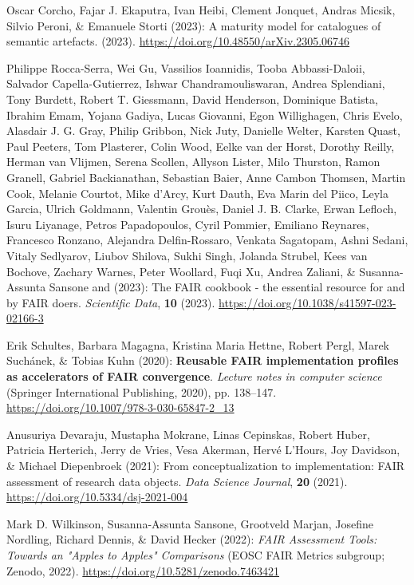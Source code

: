 \begin{thebibliography}{9}
Oscar Corcho, Fajar J. Ekaputra, Ivan Heibi, Clement Jonquet, Andras
Micsik, Silvio Peroni, \& Emanuele Storti (2023): A maturity model for
catalogues of semantic artefacts. (2023).
\url{https://doi.org/10.48550/arXiv.2305.06746}

Philippe Rocca-Serra, Wei Gu, Vassilios Ioannidis, Tooba Abbassi-Daloii,
Salvador Capella-Gutierrez, Ishwar Chandramouliswaran, Andrea
Splendiani, Tony Burdett, Robert T. Giessmann, David Henderson,
Dominique Batista, Ibrahim Emam, Yojana Gadiya, Lucas Giovanni, Egon
Willighagen, Chris Evelo, Alasdair J. G. Gray, Philip Gribbon, Nick
Juty, Danielle Welter, Karsten Quast, Paul Peeters, Tom Plasterer, Colin
Wood, Eelke van der Horst, Dorothy Reilly, Herman van Vlijmen, Serena
Scollen, Allyson Lister, Milo Thurston, Ramon Granell, Gabriel
Backianathan, Sebastian Baier, Anne Cambon Thomsen, Martin Cook, Melanie
Courtot, Mike d'Arcy, Kurt Dauth, Eva Marin del Piico, Leyla Garcia,
Ulrich Goldmann, Valentin Grouès, Daniel J. B. Clarke, Erwan Lefloch,
Isuru Liyanage, Petros Papadopoulos, Cyril Pommier, Emiliano Reynares,
Francesco Ronzano, Alejandra Delfin-Rossaro, Venkata Sagatopam, Ashni
Sedani, Vitaly Sedlyarov, Liubov Shilova, Sukhi Singh, Jolanda Strubel,
Kees van Bochove, Zachary Warnes, Peter Woollard, Fuqi Xu, Andrea
Zaliani, \& Susanna-Assunta Sansone and (2023): The {FAIR} cookbook -
the essential resource for and by {FAIR} doers. \emph{Scientific Data},
\textbf{10} (2023).
\url{https://doi.org/10.1038/s41597-023-02166-3}

Erik Schultes, Barbara Magagna, Kristina Maria Hettne, Robert Pergl,
Marek Suchánek, \& Tobias Kuhn (2020): \textbf{Reusable {FAIR}
implementation profiles as accelerators of {FAIR} convergence}.
\emph{Lecture notes in computer science} (Springer International
Publishing, 2020), pp. 138--147.
\url{https://doi.org/10.1007/978-3-030-65847-2_13}

Anusuriya Devaraju, Mustapha Mokrane, Linas Cepinskas, Robert Huber,
Patricia Herterich, Jerry de Vries, Vesa Akerman, Hervé L'Hours, Joy
Davidson, \& Michael Diepenbroek (2021): From conceptualization to
implementation: {FAIR} assessment of research data objects. \emph{Data
Science Journal}, \textbf{20} (2021).
\url{https://doi.org/10.5334/dsj-2021-004}

Mark D. Wilkinson, Susanna-Assunta Sansone, Grootveld Marjan, Josefine
Nordling, Richard Dennis, \& David Hecker (2022): \emph{{FAIR Assessment
Tools: Towards an "Apples to Apples" Comparisons}} ({EOSC} {FAIR}
Metrics subgroup; Zenodo, 2022).
\url{https://doi.org/10.5281/zenodo.7463421}


\end{thebibliography}
